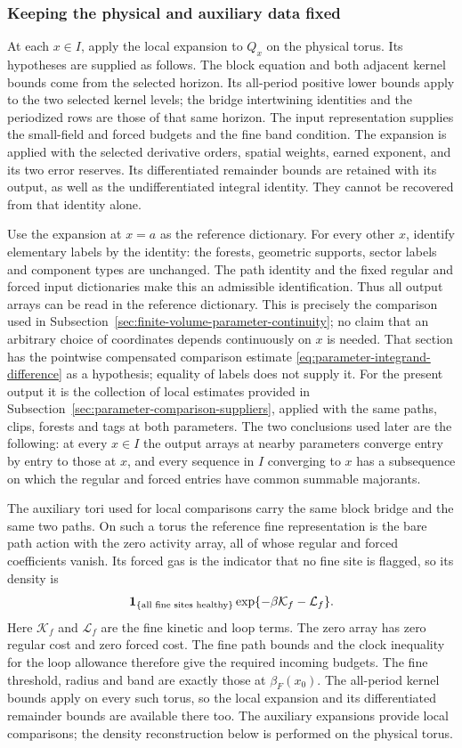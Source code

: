 \subsubsection{Keeping the physical and auxiliary data fixed}
At each $x\in I$, apply the local expansion to $Q_x$ on the physical
torus. Its hypotheses are supplied as follows. The block equation and
both adjacent kernel bounds come from the selected horizon. Its
all-period positive lower bounds apply to the two selected kernel levels;
the bridge intertwining identities and the periodized rows are those
of that same horizon. The input representation supplies the small-field
and forced budgets and the fine band condition. The expansion is applied
with the selected derivative orders, spatial weights, earned exponent,
and its two error reserves. Its differentiated remainder bounds are
retained with its output, as well as the undifferentiated integral
identity. They cannot be recovered from that identity alone.

Use the expansion at $x=a$ as the reference dictionary. For every other
$x$, identify elementary labels by the identity: the forests, geometric
supports, sector labels and component types are unchanged. The path
identity and the fixed regular and forced input dictionaries make this
an admissible identification. Thus all output arrays can be read in the
reference dictionary. This is precisely the comparison used in
Subsection~\ref{sec:finite-volume-parameter-continuity}; no claim that an
arbitrary choice of coordinates depends continuously on $x$ is needed.
That section has the pointwise compensated comparison estimate
\eqref{eq:parameter-integrand-difference} as a hypothesis; equality
of labels does not supply it. For the present output it is the
collection of local estimates provided in
Subsection~\ref{sec:parameter-comparison-suppliers}, applied with the
same paths, clips, forests and tags at both parameters. The two
conclusions used later are the following: at every $x\in I$ the
output arrays at nearby parameters converge entry by entry to those
at $x$, and every sequence in $I$ converging to $x$ has a subsequence
on which the regular and forced entries have common summable
majorants.

The auxiliary tori used for local comparisons carry the same block
bridge and the same two paths. On such a torus the reference fine
representation is the bare path action with the zero activity array,
all of whose regular and forced coefficients vanish. Its forced gas
is the indicator that no fine site is flagged, so its density is
\[
 {\bf1}_{\{\text{all fine sites healthy}\}}
 \exp\{-\beta\mathcal K_f-\mathcal L_f\}.
\]
Here $\mathcal K_f$ and $\mathcal L_f$ are the fine kinetic and loop
terms. The zero array has zero regular cost and zero forced cost.
The fine path bounds and the clock inequality for the loop allowance
therefore give the required incoming budgets. The fine threshold,
radius and band are exactly those at $\beta_F(x_0)$. The all-period
kernel bounds apply on every such torus, so the local expansion and its
differentiated remainder bounds are available there too. The auxiliary
expansions provide local comparisons; the density reconstruction below
is performed on the physical torus.

